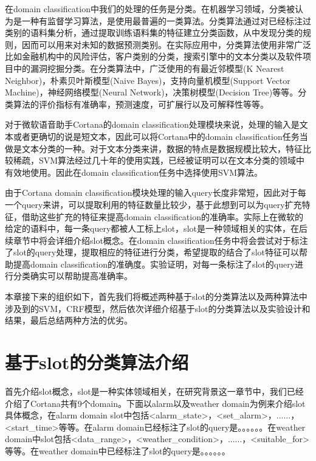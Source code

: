 \documentclass[master]{njuthesis}
\begin{document}
    在domain classification中我们的处理的任务是分类。在机器学习领域，分类被认为是一种有监督学习算法，是使用最普遍的一类算法。分类算法通过对已经标注过类别的语料集分析，通过提取训练语料集的特征建立分类函数，从中发现分类的规则，因而可以用来对未知的数据预测类别。在实际应用中，分类算法使用非常广泛比如金融机构中的风险评估，客户类别的分类，搜索引擎中的文本分类以及软件项目中的漏洞挖掘分类。在分类算法中，广泛使用的有最近邻模型(K Nearest Neighbor)，朴素贝叶斯模型(Naive Bayes)，支持向量机模型(Support Vector Machine)，神经网络模型(Neural Network)，决策树模型(Decision Tree)等等。分类算法的评价指标有准确率，预测速度，可扩展行以及可解释性等等。
    
    对于微软语音助手Cortana的domain classification处理模块来说，处理的输入是文本或者更确切的说是短文本，因此可以将Cortana中的domain classification任务当做是文本分类的一种。对于文本分类来讲，数据的特点是数据规模比较大，特征比较稀疏，SVM算法经过几十年的使用实践，已经被证明可以在文本分类的领域中有效地使用。因此在domain classification任务中选择使用SVM算法。
    
    由于Cortana domain classification模块处理的输入query长度非常短，因此对于每一个query来讲，可以提取利用的特征数量比较少，基于此想到可以为query扩充特征，借助这些扩充的特征来提高domain classification的准确率。实际上在微软的给定的语料中，每一条query都被人工标上slot，slot是一种领域相关的实体，在后续章节中将会详细介绍slot概念。在domain classification任务中将会尝试对于标注了slot的query处理，提取相应的特征进行分类，希望提取的结合了slot特征可以帮助提高domain classification的准确度。实验证明，对每一条标注了slot的query进行分类确实可以帮助提高准确率。
    
    本章接下来的组织如下，首先我们将概述两种基于slot的分类算法以及两种算法中涉及到的SVM，CRF模型，然后依次详细介绍基于slot的分类算法以及实验设计和结果，最后总结两种方法的优劣。

    
\section{基于slot的分类算法介绍}
   
    首先介绍slot概念，slot是一种实体领域相关，在研究背景这一章节中，我们已经介绍了Cortana共有9个domain。下面以alarm以及weather domain为例来介绍slot具体概念，在alarm domain slot中包括<alarm\_state>，<set\_alarm>，......，<start\_time>等等。在alarm domain已经标注了slot的query是。。。。。。在weather domain中slot包括<data\_range>，<weather\_condition>，......，<suitable\_for>等等。在weather domain中已经标注了slot的query是。。。。。。
\end{document}
